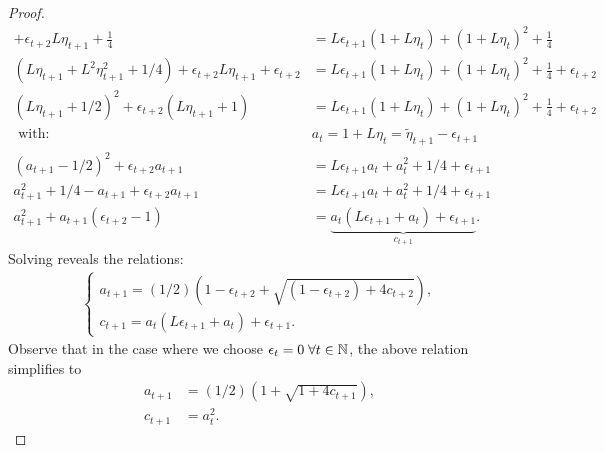 \documentclass[12pt]{article}
\begin{document}
\begin{proof}
\begin{align*}
            + 
            \epsilon_{t + 2} L \eta_{t + 1} 
            + 
            \frac{1}{4}
            &= 
            L\epsilon_{t + 1}(1 + L \eta_t)  + (1 + L\eta_t)^2
            + 
            \frac{1}{4}
            \\
            (L\eta_{t + 1} + L^2\eta_{t + 1}^2 + 1/4)
            + 
            \epsilon_{t + 2} L \eta_{t + 1} 
            + \epsilon_{t + 2}
            &= 
            L\epsilon_{t + 1}(1 + L \eta_t)  + (1 + L\eta_t)^2
            + \frac{1}{4}
            + \epsilon_{t + 2}
            \\
            (L\eta_{t + 1} + 1/2)^2 + \epsilon_{t + 2}(L \eta_{t + 1} + 1)
            &= 
            L \epsilon_{t + 1}(1 + L \eta_t) + (1 + L\eta_t)^2
            + \frac{1}{4} + \epsilon_{t + 2}
            \\
            \text{ with: } & a_t = 1 + L \eta_t = \tilde \eta_{t + 1} - \epsilon_{t + 1}
            \\
            (a_{t + 1} - 1/2)^2 + \epsilon_{t + 2}a_{t + 1}
            &= 
            L \epsilon_{t + 1}a_t + a_t^2 + 1/4 + \epsilon_{t + 1}
            \\
            a_{t + 1}^2 + 1/4 - a_{t + 1} + \epsilon_{t + 2}a_{t + 1}
            &= 
            L \epsilon_{t + 1}a_t + a_t^2 + 1/4 + \epsilon_{t + 1}
            \\
            a_{t + 1}^2 + a_{t + 1}(\epsilon_{t + 2} - 1)
            &= 
            \underbrace{
                a_t(L \epsilon_{t + 1} + a_t) + \epsilon_{t + 1}
            }_{c_{t + 1}}. 
        \end{align*}
        Solving reveals the relations: 
        \begin{align*}
            \begin{cases}
                a_{t + 1} = (1/2)\left(
                1 - \epsilon_{t + 2} + \sqrt{(1 - \epsilon_{t + 2}) + 4 c_{t + 2}}
                \right), 
                \\
                c_{t + 1} = a_t (L \epsilon_{t + 1} + a_t) + \epsilon_{t + 1}. 
            \end{cases}
        \end{align*}
        Observe that in the case where we choose $\epsilon_t = 0\; \forall t \in \mathbb N$, the above relation simplifies to 
        \begin{align*}
            a_{t + 1} &= (1/2)\left(
                1 + \sqrt{1 + 4 c_{t + 1}}
            \right), 
            \\
            c_{t + 1} &= a_t^2. 

\end{align*}
\end{proof}
\end{document}
